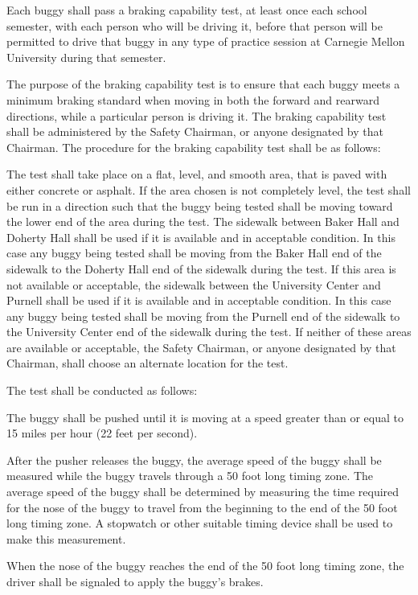	Each buggy shall pass a braking capability test, at least once each school
	semester, with each person who will be driving it, before that person will be
	permitted to drive that buggy in any type of practice session at Carnegie
	Mellon University during that semester.

	The purpose of the braking capability test is to ensure that each buggy meets a
	minimum braking standard when moving in both the forward and rearward
	directions, while a particular person is driving it. The braking capability
	test shall be administered by the Safety Chairman, or anyone designated by that
	Chairman. The procedure for the braking capability test shall be as follows:

	The test shall take place on a flat, level, and smooth area, that is paved with
	either concrete or asphalt. If the area chosen is not completely level, the
	test shall be run in a direction such that the buggy being tested shall be
	moving toward the lower end of the area during the test. The sidewalk between
	Baker Hall and Doherty Hall shall be used if it is available and in acceptable
	condition. In this case any buggy being tested shall be moving from the Baker
	Hall end of the sidewalk to the Doherty Hall end of the sidewalk during the
	test. If this area is not available or acceptable, the sidewalk between the
	University Center and Purnell shall be used if it is available and in
	acceptable condition. In this case any buggy being tested shall be moving from
	the Purnell end of the sidewalk to the University Center end of the sidewalk
	during the test. If neither of these areas are available or acceptable, the
	Safety Chairman, or anyone designated by that Chairman, shall choose an
	alternate location for the test.

	The test shall be conducted as follows:

	The buggy shall be pushed until it is moving at a speed greater than or equal
	to 15 miles per hour (22 feet per second).

	After the pusher releases the buggy, the average speed of the buggy shall be
	measured while the buggy travels through a 50 foot long timing zone. The
	average speed of the buggy shall be determined by measuring the time required
	for the nose of the buggy to travel from the beginning to the end of the 50
	foot long timing zone. A stopwatch or other suitable timing device shall be
	used to make this measurement.

	When the nose of the buggy reaches the end of the 50 foot long timing zone, the
	driver shall be signaled to apply the buggy's brakes.

